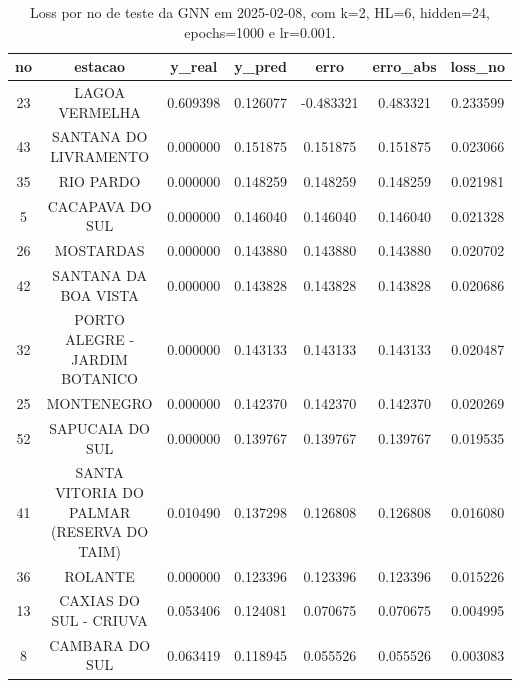 \begin{table}[h]
\centering
\caption{Loss por no de teste da GNN em 2025-02-08, com k=2, HL=6, hidden=24, epochs=1000 e lr=0.001.}
\label{tab:gnn_loss_k2_hl6_h24_e1000_d20250208}
\begin{tabular}{ccccccc}
\toprule
no & estacao & y\_real & y\_pred & erro & erro\_abs & loss\_no \\
\midrule
23 & LAGOA VERMELHA & 0.609398 & 0.126077 & -0.483321 & 0.483321 & 0.233599 \\
43 & SANTANA DO LIVRAMENTO & 0.000000 & 0.151875 & 0.151875 & 0.151875 & 0.023066 \\
35 & RIO PARDO & 0.000000 & 0.148259 & 0.148259 & 0.148259 & 0.021981 \\
5 & CACAPAVA DO SUL & 0.000000 & 0.146040 & 0.146040 & 0.146040 & 0.021328 \\
26 & MOSTARDAS & 0.000000 & 0.143880 & 0.143880 & 0.143880 & 0.020702 \\
42 & SANTANA DA BOA VISTA & 0.000000 & 0.143828 & 0.143828 & 0.143828 & 0.020686 \\
32 & PORTO ALEGRE - JARDIM BOTANICO & 0.000000 & 0.143133 & 0.143133 & 0.143133 & 0.020487 \\
25 & MONTENEGRO & 0.000000 & 0.142370 & 0.142370 & 0.142370 & 0.020269 \\
52 & SAPUCAIA DO SUL & 0.000000 & 0.139767 & 0.139767 & 0.139767 & 0.019535 \\
41 & SANTA VITORIA DO PALMAR (RESERVA DO TAIM) & 0.010490 & 0.137298 & 0.126808 & 0.126808 & 0.016080 \\
36 & ROLANTE & 0.000000 & 0.123396 & 0.123396 & 0.123396 & 0.015226 \\
13 & CAXIAS DO SUL - CRIUVA & 0.053406 & 0.124081 & 0.070675 & 0.070675 & 0.004995 \\
8 & CAMBARA DO SUL & 0.063419 & 0.118945 & 0.055526 & 0.055526 & 0.003083 \\
\bottomrule
\end{tabular}
\end{table}
